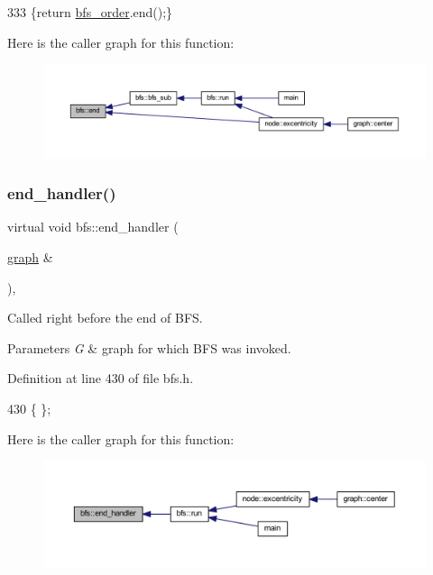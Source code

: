 \begin{DoxyCode}
333     \{\textcolor{keywordflow}{return} \mbox{\hyperlink{classbfs_a2596d2cf52f6e7922fd94ce1adde760e}{bfs\_order}}.end();\}
\end{DoxyCode}
Here is the caller graph for this function\+:
\nopagebreak
\begin{figure}[H]
\begin{center}
\leavevmode
\includegraphics[width=350pt]{classbfs_ac35b3d3c37d33eb80adb752e17a60df9_icgraph}
\end{center}
\end{figure}
\mbox{\label{classbfs_adbabb41ab56b92606fe7b53f346142ed}} 
\subsubsection{\texorpdfstring{end\+\_\+handler()}{end\_handler()}}
{\footnotesize\ttfamily virtual void bfs\+::end\+\_\+handler (\begin{DoxyParamCaption}\item[{\mbox{\hyperlink{classgraph}{graph}} \&}]{ }\end{DoxyParamCaption})\hspace{0.3cm}{\ttfamily [inline]}, {\ttfamily [virtual]}}



Called right before the end of B\+FS. 


\begin{DoxyParams}{Parameters}
{\em G} & graph for which B\+FS was invoked. \\
\hline
\end{DoxyParams}


Definition at line 430 of file bfs.\+h.


\begin{DoxyCode}
430 \{ \};
\end{DoxyCode}
Here is the caller graph for this function\+:
\nopagebreak
\begin{figure}[H]
\begin{center}
\leavevmode
\includegraphics[width=350pt]{classbfs_adbabb41ab56b92606fe7b53f346142ed_icgraph}
\end{center}
\end{figure}
\mbox{\label{classbfs_a3e1a7b0e4bde586d0be44616e533c59c}} 
